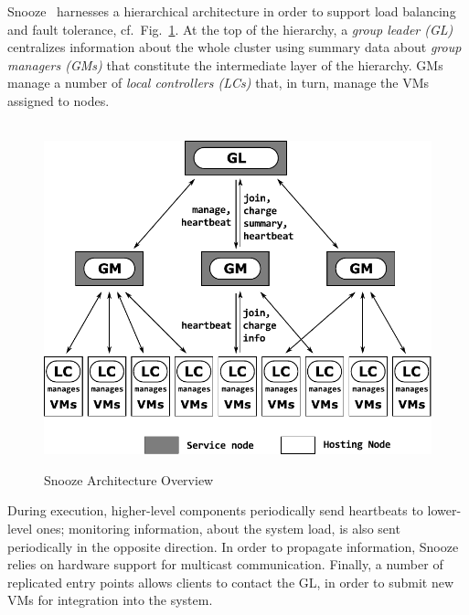 

Snooze~\cite{snoozeweb,snoozedev14} harnesses a hierarchical
architecture in order to support load balancing and fault tolerance,
cf.\ Fig.~\ref{fig:snoozearch}. At the top of the hierarchy, a
\emph{group leader (GL)} centralizes information about the whole
cluster using summary data about \emph{group managers (GMs)} that
constitute the intermediate layer of the hierarchy. GMs manage a
number of \emph{local controllers (LCs)} that, in turn, manage the VMs
assigned to nodes.

\begin{figure}
  {\centering ~\includegraphics[width=.99\linewidth]{figures/snoozearch.pdf}}
  \caption{Snooze Architecture Overview}
  \label{fig:snoozearch}
\end{figure}
During execution, higher-level components periodically send heartbeats
to lower-level ones; monitoring information, \eg about the system
load, is also sent periodically in the opposite direction. In order to
propagate information, Snooze relies on hardware support for multicast
communication. Finally, a number of replicated entry points allows
clients to contact the GL, \eg in order to submit new VMs for
integration into the system.

